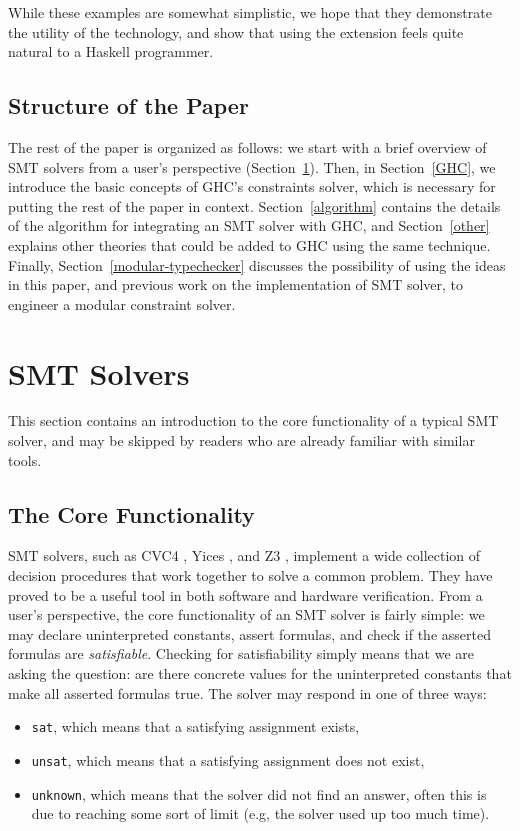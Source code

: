 \documentclass{sigplanconf}
\begin{document}
While these examples are somewhat simplistic, we hope
that they demonstrate the utility of the technology,
and show that using the extension feels quite natural
to a Haskell programmer.


\subsection{Structure of the Paper}

The rest of the paper is organized as follows:
we start with a brief overview of SMT solvers from a user's perspective
(Section~\ref{smt}).  Then, in Section~\ref{GHC}, we introduce the
basic concepts of GHC's constraints
solver, which is necessary for putting the rest of the paper in context.
Section~\ref{algorithm} contains the details of the algorithm for
integrating an SMT solver with GHC, and Section~\ref{other} explains
other theories that could be added to GHC using the same technique.
Finally, Section~\ref{modular-typechecker} discusses the possibility
of using the ideas in this paper, and previous work on the
implementation of SMT solver, to engineer a modular constraint solver.


\section {SMT Solvers}
\label{smt}

This section contains an introduction to the core functionality
of a typical SMT solver, and may be skipped by readers who are already
familiar with similar tools.

\subsection{The Core Functionality}

SMT solvers, such as CVC4 \cite{cvc4}, Yices \cite{yices}, and Z3
\cite{z3}, implement a wide collection of decision procedures that
work together to solve a common problem.  They have proved to be a useful
tool in both software and hardware verification.
From a user's perspective, the core functionality of an SMT solver is fairly
simple: we may declare uninterpreted constants, assert formulas,
and check if the asserted formulas are {\em satisfiable}.  Checking
for satisfiability simply means that we are asking the
question: are there concrete values for the uninterpreted constants
that make all asserted formulas true. The solver may respond in
one of three ways:
\begin{itemize}
\item \Verb"sat", which means that a satisfying assignment exists,
\item \Verb"unsat", which means that a satisfying assignment does not exist,
\item \Verb"unknown", which means that the solver did not find an answer,
      often this is due to reaching some sort of limit (e.g, the solver
      used up too much time).
\end{itemize}
\end{document}

